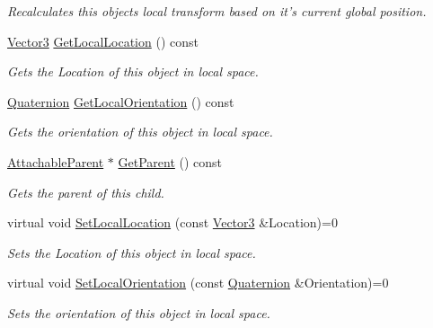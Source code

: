 \begin{DoxyCompactItemize}
\begin{DoxyCompactList}\small\item\em Recalculates this objects local transform based on it's current global position. \item\end{DoxyCompactList}\item 
\hyperlink{classMezzanine_1_1Vector3}{Vector3} \hyperlink{classMezzanine_1_1AttachableChild_a59bbbc115c028f87db652f32d252ee61}{GetLocalLocation} () const 
\begin{DoxyCompactList}\small\item\em Gets the Location of this object in local space. \item\end{DoxyCompactList}\item 
\hyperlink{classMezzanine_1_1Quaternion}{Quaternion} \hyperlink{classMezzanine_1_1AttachableChild_a81104f92420f9558b39144cce4eb7cd0}{GetLocalOrientation} () const 
\begin{DoxyCompactList}\small\item\em Gets the orientation of this object in local space. \item\end{DoxyCompactList}\item 
\hyperlink{classMezzanine_1_1AttachableParent}{AttachableParent} $\ast$ \hyperlink{classMezzanine_1_1AttachableChild_a16e42db1e1a69f5ca41d412fcc3a5aeb}{GetParent} () const 
\begin{DoxyCompactList}\small\item\em Gets the parent of this child. \item\end{DoxyCompactList}\item 
virtual void \hyperlink{classMezzanine_1_1AttachableChild_a527ef7ddbf4c3936214eff5af821ae63}{SetLocalLocation} (const \hyperlink{classMezzanine_1_1Vector3}{Vector3} \&Location)=0
\begin{DoxyCompactList}\small\item\em Sets the Location of this object in local space. \item\end{DoxyCompactList}\item 
virtual void \hyperlink{classMezzanine_1_1AttachableChild_a3604a2450a1647ae882ef1d9dab1ec5d}{SetLocalOrientation} (const \hyperlink{classMezzanine_1_1Quaternion}{Quaternion} \&Orientation)=0
\begin{DoxyCompactList}\small\item\em Sets the orientation of this object in local space. \item\end{DoxyCompactList}\end{DoxyCompactItemize}
